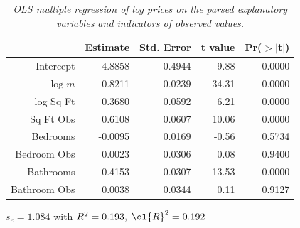 \documentclass[12pt]{article}
\begin{document}
 \begin{table}
 \caption{ \label{tab:parsed} {\sl OLS multiple regression of log prices on the
 parsed explanatory variables and  indicators of observed values.}}

\begin{center}
\begin{tabular}{rrrrr}
  \hline
 & Estimate & Std. Error & t value & Pr($>$$|$t$|$) \\ 
  \hline
 Intercept & 4.8858 & 0.4944 & 9.88 & 0.0000 \\ 
  $\log m$ & 0.8211 & 0.0239 & 34.31 & 0.0000 \\ 
  log Sq Ft & 0.3680 & 0.0592 & 6.21 & 0.0000 \\ 
  Sq Ft Obs & 0.6108 & 0.0607 & 10.06 & 0.0000 \\ 
  Bedrooms & -0.0095 & 0.0169 & -0.56 & 0.5734 \\ 
  Bedroom Obs & 0.0023 & 0.0306 & 0.08 & 0.9400 \\ 
  Bathrooms & 0.4153 & 0.0307 & 13.53 & 0.0000 \\ 
  Bathroom Obs & 0.0038 & 0.0344 & 0.11 & 0.9127 \\ 
   \hline
\end{tabular}

   $s_e = 1.084$ with $R^2= 0.193,\;	\ol{R}^2 = 0.192$ 
 \end{center}
\end{table}
\end{document}
